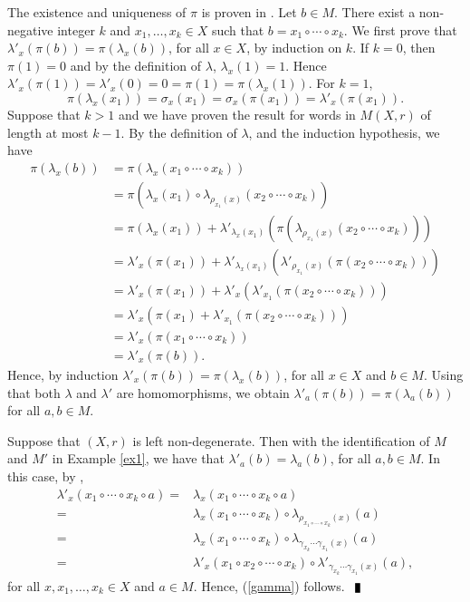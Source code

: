 \documentclass[10pt]{article}
\newenvironment{proof}{\par\noindent{\bf Proof.}}{$\qed$\par\bigskip}
\newcommand{\qed}{\enspace\vrule  height6pt  width4pt  depth2pt}
\begin{document}
\begin{proof} The existence and uniqueness of $\pi$ is proven in \cite[Proposition 3.2]{CJV}.
Let $b\in M$. There exist a non-negative integer $k$ and $x_1,\dots ,x_k\in X$ such that $b=x_1\circ \cdots\circ x_k$. We first prove that
$\lambda'_x(\pi(b))=\pi(\lambda_x(b))$, for all $x\in X$, by induction on $k$. If $k=0$, then $\pi(1)=0$ and by the definition of $\lambda$, $\lambda_x(1)=1$. Hence $\lambda'_x(\pi(1))=\lambda'_x(0)=0=\pi(1)=\pi(\lambda_x(1))$. For $k=1$, \[\pi(\lambda_x(x_1))=\sigma_x(x_1)=\sigma_x(\pi(x_1))=\lambda'_x(\pi(x_1)).\]
Suppose that $k>1$ and we have proven the result for words in $M(X,r)$ of length at most $k-1$. By the definition of $\lambda$, \cite[Theorem 2.1]{CJV} and the induction hypothesis, we have
\begin{align*}
	\pi(\lambda_x(b)) &=\pi(\lambda_x(x_1\circ \cdots \circ x_k))\\
	& =\pi(\lambda_x(x_1)\circ\lambda_{\rho_{x_1}(x)}(x_2\circ\cdots\circ x_k))\\
	& =\pi(\lambda_x(x_1))+\lambda'_{\lambda_x(x_1)}(\pi(\lambda_{\rho_{x_1}(x)}(x_2\circ\cdots \circ x_k)))\\
	& =\lambda'_x(\pi(x_1))+\lambda'_{\lambda_x(x_1)}(\lambda'_{\rho_{x_1}(x)}(\pi(x_2\circ\cdots\circ x_k)))\\
	& =\lambda'_x(\pi(x_1))+\lambda'_x(\lambda'_{x_1}(\pi(x_2\circ\cdots\circ x_k)))\\
	& =\lambda'_x(\pi(x_1)+\lambda'_{x_1}(\pi(x_2\circ\cdots\circ x_k)))\\
	& =\lambda'_x(\pi(x_1\circ\cdots \circ x_k))\\
	& =\lambda'_x(\pi(b)).
\end{align*}
Hence, by induction $\lambda'_x(\pi(b))=\pi(\lambda_x(b))$, for all $x\in X$ and $b\in M$.
Using that both $\lambda$ and $\lambda'$ are homomorphisms, we obtain $\lambda'_{a}(\pi(b))=\pi(\lambda_{a}(b))$
for all $a,b\in M$.	
	
Suppose that $(X,r)$ is left non-degenerate. Then with the identification of $M$ and $M'$ in Example \ref{ex1}, we have that 
$\lambda'_a(b)=\lambda_a(b)$, for all $a,b\in M$. In this case, by \cite[theorem 2.1]{CJV},
\begin{align*}\lambda'_x(x_1\circ\cdots\circ x_k\circ a)=&\lambda_x(x_1\circ\cdots\circ x_k\circ a)\\
	=&\lambda_x(x_1\circ \cdots \circ x_k)\circ\lambda_{\rho_{x_1\circ\cdots\circ x_k}(x)}(a)\\
	=&\lambda_x(x_1\circ \cdots \circ x_k)\circ\lambda_{\gamma_{x_k}\cdots \gamma_{x_1}(x)}(a)\\
	=&\lambda'_x(x_1\circ x_2\circ\cdots\circ x_k)\circ \lambda'_{\gamma_{x_k}\cdots \gamma_{x_1}(x)}(a),
\end{align*}
for all $x,x_1,\dots ,x_k\in X$ and $a\in M$. Hence, (\ref{gamma}) follows. 
\end{proof}
\end{document}
